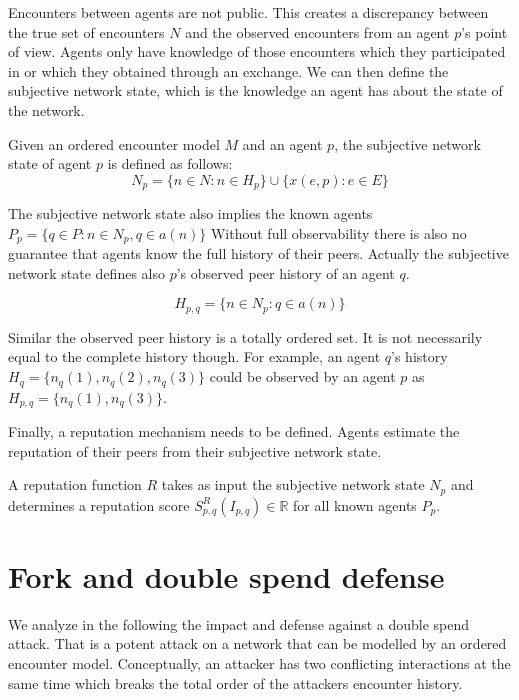 Encounters between agents are not public. This creates a discrepancy between the true set of 
encounters $N$ and the observed encounters from an agent $p$'s point of view. Agents only have 
knowledge of those encounters which they participated in or which they obtained through an exchange.
We can then define the subjective network state, which is the knowledge an agent has about the state of
the network.

\begin{defn}
    \label{def:subjective_network_state}
    Given an ordered encounter model $M$ and an agent $p$, the subjective network state of agent $p$
    is defined as follows:
    \begin{equation}
        N_p = \{ n \in N : n \in H_p \} \cup \{ x(e, p) : e \in E \}
    \end{equation}
\end{defn}

The subjective network state also implies the known agents $P_p = \{ q \in P : n \in N_p, q \in a(n) \}$
Without full observability there is also no guarantee that agents know the full history of their 
peers. Actually the subjective network state defines also $p$'s observed peer history of an agent $q$.

\begin{equation}
    H_{p, q} = \{ n \in N_p : q \in a(n) \}
\end{equation}

Similar the observed peer history is a totally ordered set. It is not necessarily equal to the 
complete history though. For example, an agent $q$'s history $H_{q} = \{n_q(1), n_q(2), n_q(3) \}$
could be observed by an agent $p$ as $H_{p, q} = \{n_q(1), n_q(3)\}$.

Finally, a reputation mechanism needs to be defined. Agents estimate the reputation of their peers
from their subjective network state. 

\begin{defn} 
    A reputation function $R$ takes as input the subjective network state $N_{p}$ and determines 
    a reputation score $S^R_{p,q}(I_{p,q}) \in \mathbb{R}$ for all known agents $P_p$.
\end{defn}

\section{Fork and double spend defense}
We analyze in the following the impact and defense against a double spend attack. That is a potent 
attack on a network that can be modelled by an ordered encounter model. Conceptually, an attacker 
has two conflicting interactions at the same time which breaks the total order of the attackers 
encounter history.

